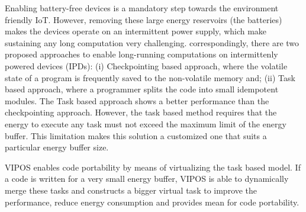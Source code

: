 

Enabling battery-free devices is a mandatory step towards the environment friendly IoT. However, removing these large energy reservoirs (the batteries) makes the devices operate on an intermittent power supply, which make sustaining any long computation very challenging. correspondingly, there are two proposed approaches to enable long-running computations on intermittenly powered devices (IPDs): (i) Checkpointing based approach, where the volatile state of a program is frequently saved to the non-volatile memory and; (ii)  Task based approach, where a programmer splits the code into small idempotent modules. The Task based approach shows a better performance than the checkpointing approach. However, the task based method requires that the energy to execute any task must not exceed the maximum limit of the energy buffer. This limitation makes this solution a customized one that suits a particular energy buffer size. 

VIPOS enables code portability by means of virtualizing the task based model. If a code is written for a very small energy buffer, VIPOS is able to dynamically merge these tasks and constructs a bigger virtual task to improve the performance, reduce energy consumption and provides mean for code portability. 
